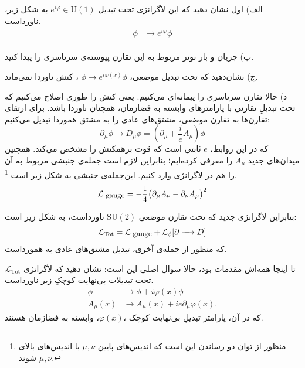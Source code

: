 \documentclass{article}
\newenvironment{parind}{%
	\par%
	\leftskip=0mm\rightskip=7mm
	\noindent\ignorespaces}{%
	\par}
\begin{document}
	\begin{parind}
		الف) اول نشان دهید که این لاگرانژی تحت تبدیل 
		$e^{i\varphi} \in \text{U}(1)$
		به شکل زیر، ناورداست.
		\begin{equation*}
			\begin{aligned}
				{\phi} &\xrightarrow{\quad } e^{i\varphi}{\phi} \\
			\end{aligned}
		\end{equation*}
		
		ب) جریان و بار نوتر مربوط به این تقارن پیوسته‌ی سرتاسری را پیدا کنید.
		
		ج) نشان‌دهید که تحت تبدیل موضعی،
		$\phi \xrightarrow{\quad } e^{i\varphi(x)}{\phi}$
		،
		کنش ناوردا نمی‌ماند.
		
		د) حالا تقارن سرتاسری را پیمانه‌ای می‌کنیم. یعنی کنش را طوری اصلاح می‌کنیم که تحت تبدیلِ تقارنی با پارامتر‌های وابسته به فضازمان، همچنان ناوردا باشد.  برای ارتقای تقارن‌ها به تقارن موضعی، مشتق‌های عادی را به مشتق هموردا تبدیل می‌کنیم:
		\[
		\partial_\mu {\phi} \xrightarrow{\quad } D_\mu {\phi} = (\partial_\mu  +\frac{i}{e}  A_\mu)  {\phi}
		\]
		که در این روابط، $e$ ثابتی است که قوت برهمکنش را مشخص می‌کند. همچنین میدان‌های جدید $A_\mu$
		را معرفی کرده‌ایم؛ بنابراین لازم است جمله‌ی جنبشی مربوط به آن را هم در لاگرانژی وارد کنیم. این‌جمله‌ی جنبشی به شکل زیر است
		\footnote{منظور از توان دو رساندن این است که اندیس‌های پایین
			$\mu,\nu$
			با اندیس‌های بالای 
			$\mu,\nu$
			شوند.
		}.
		\[
		\mathcal{L}_{\text{\small gauge}} = -\frac14 \big(
		\partial_\mu A_\nu - \partial_\nu A_\mu
		\big)^2
		\]
		
		بنابراین لاگرانژی جدید که تحت تقارن موضعی 
		$\text{SU}(2)$
		ناورداست، به شکل زیر است:
		\[
		\mathcal{L}_{\text{Tot}} =  \mathcal{L}_{\text{\small gauge}} + \mathcal{L}_{\phi}[\partial \xrightarrow{\quad} D]
		\]
		که منظور از جمله‌ی آخری، تبدیل مشتق‌های عادی به همورداست.
		
		تا اینجا همه‌اش مقدمات بود، حالا سوال اصلی این است: نشان دهید که لاگرانژی 
		$\mathcal{L}_{\text{Tot}} $
		تحت تبدیلات بی‌نهایت کوچکِ زیر ناورداست.
		\begin{equation*}
			\begin{aligned}
				\phi &\xrightarrow{\quad} {\phi} + i \varphi (x) {\phi} \\ 
				A_\mu (x) &\xrightarrow{\quad} A_\mu(x) + ie \partial_\mu \varphi(x).
			\end{aligned}
		\end{equation*}
		که در آن، پارامتر تبدیلِ بی‌نهایت کوچک
		،$\varphi(x)$،
		وابسته به فضازمان هستند.
	\end{parind}
\end{document}
